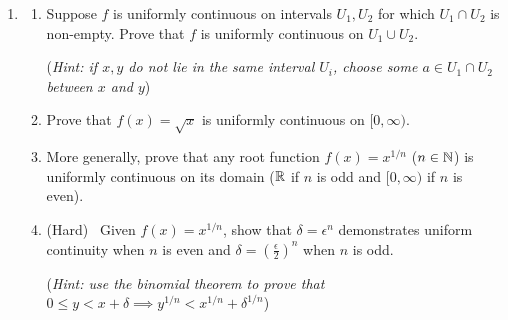 \begin{exercisessec}{}{}
\begin{enumerate}
  \item\label{exs:unifcontunion}\begin{enumerate}
    \item Suppose $f$ is uniformly continuous on intervals $U_1,U_2$ for which $U_1\cap U_2$ is non-empty. Prove that $f$ is uniformly continuous on $U_1\cup U_2$.\par
    (\emph{Hint: if $x,y$ do not lie in the same interval $U_i$, choose some $a\in U_1\cap U_2$ between $x$ and $y$})

		\item Prove that $f(x)=\sqrt x$ is uniformly continuous on $[0,\infty)$.
		
		\item More generally, prove that any root function $f(x)=x^{1/n}$ ($n\in\mathbb{N}$) is uniformly continuous on its domain ($\mathbb{R}$ if $n$ is odd and $[0,\infty)$ if $n$ is even).
		
		\item (Hard) \ Given $f(x)=x^{1/n}$, show that $\delta=\epsilon^n$ demonstrates uniform continuity when $n$ is even and $\delta=\left(\frac\epsilon 2\right)^n$ when $n$ is odd.\par
		(\emph{Hint: use the binomial theorem to prove that $0\le y<x+\delta\implies y^{1/n}<x^{1/n}+\delta^{1/n}$})
	\end{enumerate}

\end{enumerate}
\end{exercisessec}

\vspace{-15pt}

